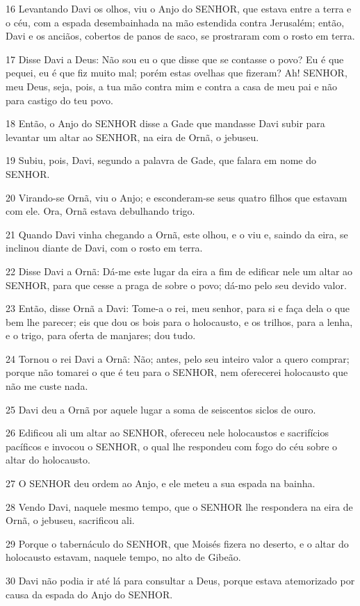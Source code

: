 \par 16 Levantando Davi os olhos, viu o Anjo do SENHOR, que estava entre a terra e o céu, com a espada desembainhada na mão estendida contra Jerusalém; então, Davi e os anciãos, cobertos de panos de saco, se prostraram com o rosto em terra.
\par 17 Disse Davi a Deus: Não sou eu o que disse que se contasse o povo? Eu é que pequei, eu é que fiz muito mal; porém estas ovelhas que fizeram? Ah! SENHOR, meu Deus, seja, pois, a tua mão contra mim e contra a casa de meu pai e não para castigo do teu povo.
\par 18 Então, o Anjo do SENHOR disse a Gade que mandasse Davi subir para levantar um altar ao SENHOR, na eira de Ornã, o jebuseu.
\par 19 Subiu, pois, Davi, segundo a palavra de Gade, que falara em nome do SENHOR.
\par 20 Virando-se Ornã, viu o Anjo; e esconderam-se seus quatro filhos que estavam com ele. Ora, Ornã estava debulhando trigo.
\par 21 Quando Davi vinha chegando a Ornã, este olhou, e o viu e, saindo da eira, se inclinou diante de Davi, com o rosto em terra.
\par 22 Disse Davi a Ornã: Dá-me este lugar da eira a fim de edificar nele um altar ao SENHOR, para que cesse a praga de sobre o povo; dá-mo pelo seu devido valor.
\par 23 Então, disse Ornã a Davi: Tome-a o rei, meu senhor, para si e faça dela o que bem lhe parecer; eis que dou os bois para o holocausto, e os trilhos, para a lenha, e o trigo, para oferta de manjares; dou tudo.
\par 24 Tornou o rei Davi a Ornã: Não; antes, pelo seu inteiro valor a quero comprar; porque não tomarei o que é teu para o SENHOR, nem oferecerei holocausto que não me custe nada.
\par 25 Davi deu a Ornã por aquele lugar a soma de seiscentos siclos de ouro.
\par 26 Edificou ali um altar ao SENHOR, ofereceu nele holocaustos e sacrifícios pacíficos e invocou o SENHOR, o qual lhe respondeu com fogo do céu sobre o altar do holocausto.
\par 27 O SENHOR deu ordem ao Anjo, e ele meteu a sua espada na bainha.
\par 28 Vendo Davi, naquele mesmo tempo, que o SENHOR lhe respondera na eira de Ornã, o jebuseu, sacrificou ali.
\par 29 Porque o tabernáculo do SENHOR, que Moisés fizera no deserto, e o altar do holocausto estavam, naquele tempo, no alto de Gibeão.
\par 30 Davi não podia ir até lá para consultar a Deus, porque estava atemorizado por causa da espada do Anjo do SENHOR.

